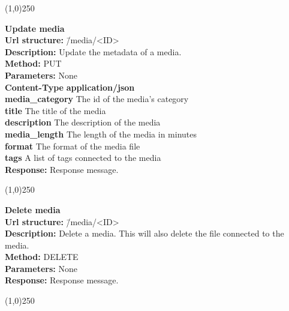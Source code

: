 \documentclass[11pt]{article}
\begin{document}
\begin{center}\line(1,0){250}\end{center}

\begin{tabbing}
\textbf{Update media} \\
\textcolor{black!60}{\textbf{Url structure:}} \hspace{0.2in} \= /media/<ID> \\
\textcolor{black!60}{\textbf{Description:}}  \> Update the metadata of a media. \\
\textcolor{black!60}{\textbf{Method:}} \> PUT \\
\textcolor{black!60}{\textbf{Parameters:}} \> None \\
\textcolor{black!60}{\textbf{Content-Type}} \> \textbf{application/json} \\
\> \textbf{media\_category} The id of the media's category \\
\> \textbf{title} The title of the media \\
\> \textbf{description} The description of the media \\
\> \textbf{media\_length} The length of the media in minutes \\
\> \textbf{format} The format of the media file \\
\> \textbf{tags} A list of tags connected to the media \\
\textcolor{black!60}{\textbf{Response:}} \> Response message.
\end{tabbing}

\begin{center}\line(1,0){250}\end{center}

\begin{tabbing}
\textbf{Delete media} \\
\textcolor{black!60}{\textbf{Url structure:}} \hspace{0.2in} \= /media/<ID> \\
\textcolor{black!60}{\textbf{Description:}}  \> Delete a media. This will also delete the file connected to the media. \\
\textcolor{black!60}{\textbf{Method:}} \> DELETE \\
\textcolor{black!60}{\textbf{Parameters:}} \> None \\
\textcolor{black!60}{\textbf{Response:}} \> Response message.
\end{tabbing}

\begin{center}\line(1,0){250}\end{center}
\end{document}
